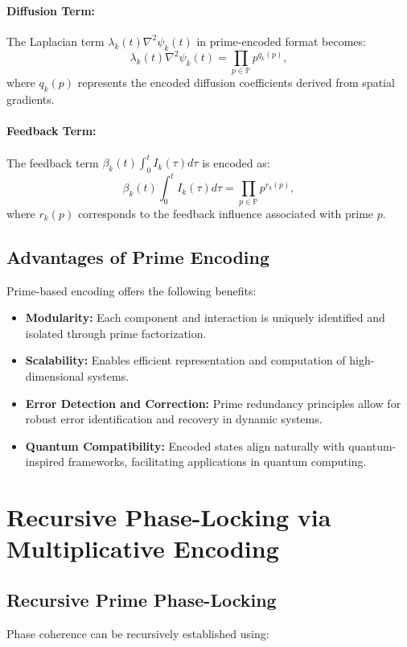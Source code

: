 \documentclass{article}
\theoremstyle{plain}
\begin{document}
\begin{itemize}
\begin{itemize}
\paragraph{Diffusion Term:}
The Laplacian term \(\lambda_k(t)\nabla^2 \psi_k(t)\) in prime-encoded format becomes:
\begin{equation}
\lambda_k(t)\nabla^2 \psi_k(t) = \prod_{p \in \mathbb{P}} p^{q_k(p)},
\end{equation}
where \(q_k(p)\) represents the encoded diffusion coefficients derived from spatial gradients.

\paragraph{Feedback Term:}
The feedback term \(\beta_k(t) \int_0^t I_k(\tau) d\tau\) is encoded as:
\begin{equation}
\beta_k(t) \int_0^t I_k(\tau) d\tau = \prod_{p \in \mathbb{P}} p^{r_k(p)},
\end{equation}
where \(r_k(p)\) corresponds to the feedback influence associated with prime \(p\).

\subsection{Advantages of Prime Encoding}
Prime-based encoding offers the following benefits:
\begin{itemize}
    \item \textbf{Modularity:} Each component and interaction is uniquely identified and isolated through prime factorization.
    \item \textbf{Scalability:} Enables efficient representation and computation of high-dimensional systems.
    \item \textbf{Error Detection and Correction:} Prime redundancy principles allow for robust error identification and recovery in dynamic systems.
    \item \textbf{Quantum Compatibility:} Encoded states align naturally with quantum-inspired frameworks, facilitating applications in quantum computing.
\end{itemize}

\section{Recursive Phase-Locking via Multiplicative Encoding}

\subsection{Recursive Prime Phase-Locking}
Phase coherence can be recursively established using:


\end{itemize}
\end{itemize}
\end{document}

